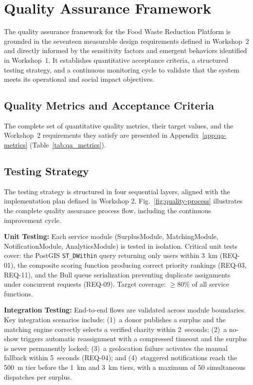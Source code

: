 \documentclass[9pt,conference]{IEEEtran}
\begin{document}
\section{Quality Assurance Framework}

The quality assurance framework for the Food Waste Reduction Platform is grounded in the seventeen measurable design requirements defined in Workshop~2 and directly informed by the sensitivity factors and emergent behaviors identified in Workshop~1. It establishes quantitative acceptance criteria, a structured testing strategy, and a continuous monitoring cycle to validate that the system meets its operational and social impact objectives.

\subsection{Quality Metrics and Acceptance Criteria}

The complete set of quantitative quality metrics, their target values, and the Workshop~2 requirements they satisfy are presented in Appendix~\ref{app:qa-metrics} (Table~\ref{tab:qa_metrics}).

\subsection{Testing Strategy}

The testing strategy is structured in four sequential layers, aligned with the implementation plan defined in Workshop 2. Fig.~\ref{fig:quality-process} illustrates the complete quality assurance process flow, including the continuous improvement cycle.

\textbf{Unit Testing:} Each service module (SurplusModule, MatchingModule, NotificationModule, AnalyticsModule) is tested in isolation. Critical unit tests cover: the PostGIS \texttt{ST\_DWithin} query returning only users within 3~km (REQ-01), the composite scoring function producing correct priority rankings (REQ-03, REQ-11), and the Bull queue serialization preventing duplicate assignments under concurrent requests (REQ-09). Target coverage: $\geq 80\%$ of all service functions.

\textbf{Integration Testing:} End-to-end flows are validated across module boundaries. Key integration scenarios include: (1)~a donor publishes a surplus and the matching engine correctly selects a verified charity within 2~seconds; (2)~a no-show triggers automatic reassignment with a compressed timeout and the surplus is never permanently locked; (3)~a geolocation failure activates the manual fallback within 5~seconds (REQ-04); and (4)~staggered notifications reach the 500~m tier before the 1~km and 3~km tiers, with a maximum of 50 simultaneous dispatches per surplus.
\end{document}
